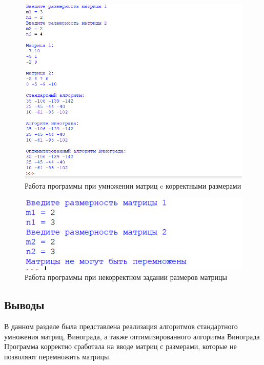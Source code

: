 \documentclass[a4paper,12pt]{article}
\begin{document}
	\begin{figure}[H]
		\centering
		\includegraphics[scale=0.6]{res.png} 
		\captionsetup{justification=centering}
		\caption{Работа программы при умножении матриц c корректными размерами}
		\label{пример1}
	\end{figure}

	\begin{figure}[H]
		\centering
		\includegraphics[scale=0.6]{res1.png} 
		\captionsetup{justification=centering}
		\caption{ Работа программы при некорректном задании размеров матрицы}
		\label{пример2}
	\end{figure}
	
    \subsection{Выводы}
    \hfill
    
    В данном разделе была представлена реализация алгоритмов стандартного умножения матриц, Винограда, а также оптимизированного алгоритма Винограда  Программа корректно сработала на вводе матриц с размерами, которые не позволяют перемножить матрицы.
    
\end{document}
